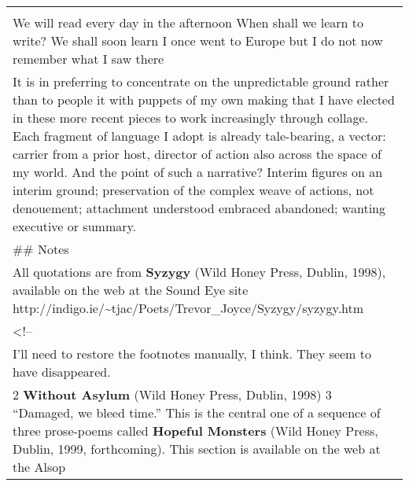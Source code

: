 \begin{longtable}[]{@{}l@{}}
\begin{minipage}[t]{0.97\columnwidth}
\end{minipage}\tabularnewline
\begin{minipage}[t]{0.97\columnwidth}\raggedright
\textbar{} We will read \textbar{} every day \textbar{} in the afternoon
\textbar{} When shall we learn \textbar{} to write? \textbar{} We shall
soon \textbar{} learn \textbar{} I once went \textbar{} to Europe
\textbar{} but I do not now \textbar{} remember \textbar{} what I saw
\textbar{} there \textbar{}\strut
\end{minipage}\tabularnewline
\begin{minipage}[t]{0.97\columnwidth}\raggedright
It is in preferring to concentrate on the unpredictable ground rather
than to people it with puppets of my own making that I have elected in
these more recent pieces to work increasingly through collage. Each
fragment of language I adopt is already tale-bearing, a vector: carrier
from a prior host, director of action also across the space of my world.
And the point of such a narrative? Interim figures on an interim ground;
preservation of the complex weave of actions, not denouement; attachment
understood embraced abandoned; wanting executive or summary.\strut
\end{minipage}\tabularnewline
\begin{minipage}[t]{0.97\columnwidth}\raggedright
\#\# Notes\strut
\end{minipage}\tabularnewline
\begin{minipage}[t]{0.97\columnwidth}\raggedright
All quotations are from \textbf{Syzygy} (Wild Honey Press, Dublin,
1998), available on the web at the Sound Eye site
http://indigo.ie/\textasciitilde{}tjac/Poets/Trevor\_Joyce/Syzygy/syzygy.htm\strut
\end{minipage}\tabularnewline
\begin{minipage}[t]{0.97\columnwidth}\raggedright
\textless{}!--\strut
\end{minipage}\tabularnewline
\begin{minipage}[t]{0.97\columnwidth}\raggedright
I'll need to restore the footnotes manually, I think. They seem to have
disappeared.\strut
\end{minipage}\tabularnewline
\begin{minipage}[t]{0.97\columnwidth}\raggedright
2 \textbf{Without Asylum} (Wild Honey Press, Dublin, 1998) 3 ``Damaged,
we bleed time.'' This is the central one of a sequence of three
prose-poems called \textbf{Hopeful Monsters} (Wild Honey Press, Dublin,
1999, forthcoming). This section is available on the web at the Alsop

\end{minipage}
\end{longtable}
